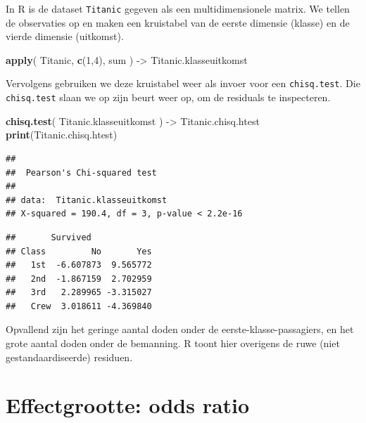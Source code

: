 \documentclass[
]{book}
\newenvironment{Shaded}{\begin{snugshade}}{\end{snugshade}}
\newcommand{\DecValTok}[1]{\textcolor[rgb]{0.00,0.00,0.81}{#1}}
\newcommand{\FunctionTok}[1]{\textcolor[rgb]{0.13,0.29,0.53}{\textbf{#1}}}
\newcommand{\NormalTok}[1]{#1}
\newcommand{\OtherTok}[1]{\textcolor[rgb]{0.56,0.35,0.01}{#1}}
\newcommand{\SpecialCharTok}[1]{\textcolor[rgb]{0.81,0.36,0.00}{\textbf{#1}}}
\begin{document}
In R is de dataset \texttt{Titanic} gegeven als een multidimensionele matrix. We tellen de observaties op en maken een kruistabel van de eerste dimensie (klasse) en de vierde dimensie (uitkomst).

\begin{Shaded}
\begin{Highlighting}[]
\FunctionTok{apply}\NormalTok{( Titanic, }\FunctionTok{c}\NormalTok{(}\DecValTok{1}\NormalTok{,}\DecValTok{4}\NormalTok{), sum ) }\OtherTok{{-}\textgreater{}}\NormalTok{ Titanic.klasseuitkomst}
\end{Highlighting}
\end{Shaded}

Vervolgens gebruiken we deze kruistabel weer als invoer voor een \texttt{chisq.test}. Die \texttt{chisq.test} slaan we op zijn beurt weer op, om de residuals te inspecteren.

\begin{Shaded}
\begin{Highlighting}[]
\FunctionTok{chisq.test}\NormalTok{( Titanic.klasseuitkomst ) }\OtherTok{{-}\textgreater{}}\NormalTok{ Titanic.chisq.htest}
\FunctionTok{print}\NormalTok{(Titanic.chisq.htest)}
\end{Highlighting}
\end{Shaded}

\begin{verbatim}
## 
##  Pearson's Chi-squared test
## 
## data:  Titanic.klasseuitkomst
## X-squared = 190.4, df = 3, p-value < 2.2e-16
\end{verbatim}

\begin{Shaded}
\end{Shaded}

\begin{verbatim}
##       Survived
## Class         No       Yes
##   1st  -6.607873  9.565772
##   2nd  -1.867159  2.702959
##   3rd   2.289965 -3.315027
##   Crew  3.018611 -4.369840
\end{verbatim}

Opvallend zijn het geringe aantal doden onder de eerste-klasse-passagiers, en het grote aantal doden onder de bemanning.
R toont hier overigens de ruwe (niet gestandaardiseerde) residuen.

\section{Effectgrootte: odds ratio}\label{effectgrootte-odds-ratio}
\end{document}
